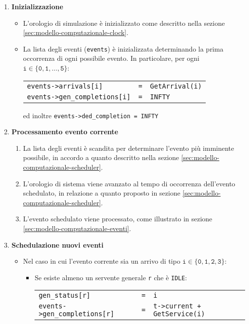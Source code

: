 \begin{enumerate}[label=Step \arabic*), align=left, leftmargin=*]
\item \textbf{Inizializzazione}
\begin{itemize}
\item L'orologio di simulazione è inizializzato come descritto nella sezione \ref{sec:modello-computazionale-clock}.
\item La lista degli eventi (\texttt{events}) è inizializzata determinando la prima occorrenza di ogni possibile evento. In particolare, per ogni $\mathtt{i \in \lbrace 0, 1, \dots, 5\rbrace}$:
\begin{center}
\begin{tabular}{l l l}
\texttt{events->arrivals[i]} & \texttt{=} & \texttt{GetArrival(i)} \\
\texttt{events->gen\_completions[i]} & \texttt{=} & \texttt{INFTY}
\end{tabular}
\end{center}
ed inoltre \texttt{events->ded\_completion = INFTY}
\end{itemize}
\item \textbf{Processamento evento corrente}
\begin{enumerate}
\item La lista degli eventi è scandita per determinare l'evento più imminente possibile, in accordo a quanto descritto nella sezione \ref{sec:modello-computazionale-scheduler}.
\item L'orologio di sistema viene avanzato al tempo di occorrenza dell'evento schedulato, in relazione a quanto proposto in sezione \ref{sec:modello-computazionale-scheduler}.
\item L'evento schedulato viene processato, come illustrato in sezione \ref{sec:modello-computazionale-eventi}.
\end{enumerate}
\item \textbf{Schedulazione nuovi eventi}
\begin{itemize}
\item Nel caso in cui l'evento corrente sia un arrivo di tipo $\mathtt{i \in \lbrace 0, 1, 2, 3 \rbrace}$:
\begin{itemize}
\item Se esiste almeno un servente generale \texttt{r} che è \texttt{IDLE}:
\begin{center}
\begin{tabular}{l l l}
\texttt{gen\_status[r]} & \texttt{=} & \texttt{i} \\
\texttt{events->gen\_completions[r]} & \texttt{=} & \texttt{t->current + GetService(i)}

\end{tabular}
\end{center}
\end{itemize}
\end{itemize}
\end{enumerate}
